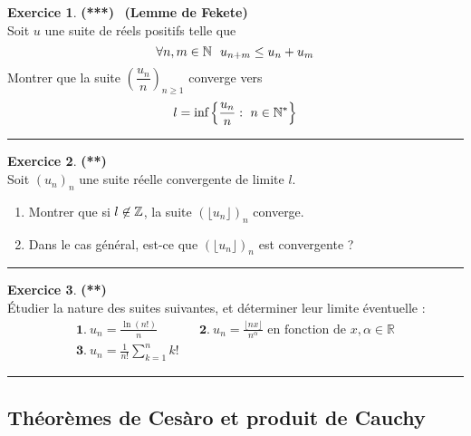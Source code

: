 \documentclass[a4paper,11pt]{article}
\theoremstyle{definition}
\newtheorem{exo}{Exercice} %
\begin{document}
\begin{minipage}{1\linewidth}
\begin{minipage}[c]{0.48\linewidth}
\begin{exo}\textbf{(***)} \ \textbf{(Lemme de Fekete)}\quad\\[0.2cm]
	Soit $u$ une suite de réels positifs telle que 
	$$\forall n,m\in \mathbb{N} \ \ u_{n+m}\leq u_n +u_m$$
	Montrer que la suite $
	\left(\dfrac{u_n}{n}\right)_{n\geq1}$ converge vers
	$$l = \text{inf}\left\{ \dfrac{u_n}{n} : \ n\in\mathbb{N}^* \right\}$$
	
	
	\centering
	\rule{1\linewidth}{0.6pt}
\end{exo}
		
		
		
	\end{minipage}	
	\hfill\vrule\hfill
	\begin{minipage}[c]{0.48\linewidth}
		\raggedright
		
		\begin{exo}\textbf{(**)}\quad\\[0.2cm]
			Soit $(u_n )_n$ une suite réelle convergente de limite $l$.
			\begin{enumerate}
				\item Montrer que si $l\not\in \mathbb{Z}$, la suite $(\lfloor u_n \rfloor)_n$ converge.
				\item Dans le cas général, est-ce que $(\lfloor u_n \rfloor)_n$ est convergente ?
			\end{enumerate}
			
			
			
			\centering
			\rule{1\linewidth}{0.6pt}
		\end{exo}
		
			\begin{exo}\textbf{(**)}\quad\\[0.2cm]
			\'Etudier la nature des suites suivantes, et déterminer leur limite éventuelle :
			$$\begin{array}{lcl}
			\displaystyle \mathbf 1.\ u_n=\frac{\ln(n!)}n&&\displaystyle\mathbf 2.\ u_n=\frac{\lfloor nx\rfloor}{n^\alpha}\textrm{ en fonction de }x,\alpha\in\mathbb R\\
			\displaystyle \mathbf 3.\ u_n=\frac{1}{n!}\sum_{k=1}^n k!
			\end{array}$$
			
			\centering
			\rule{1\linewidth}{0.6pt}
		\end{exo}	
	
	

		
		\subsection*{Théorèmes de Cesàro et produit de Cauchy}
		

\end{minipage}
\end{minipage}
\end{document}
